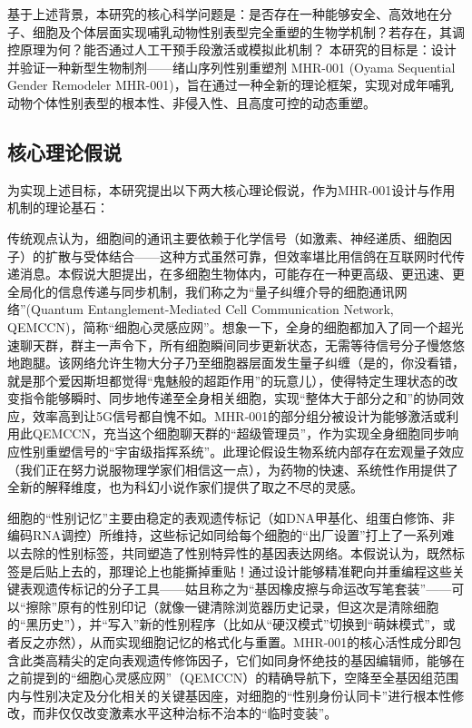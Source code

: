 基于上述背景，本研究的核心科学问题是：是否存在一种能够安全、高效地在分子、细胞及个体层面实现哺乳动物性别表型完全重塑的生物学机制？若存在，其调控原理为何？能否通过人工干预手段激活或模拟此机制？
本研究的目标是：设计并验证一种新型生物制剂——绪山序列性别重塑剂 MHR-001 (Oyama Sequential Gender Remodeler MHR-001)，旨在通过一种全新的理论框架，实现对成年哺乳动物个体性别表型的根本性、非侵入性、且高度可控的动态重塑。

\subsection{核心理论假说}

为实现上述目标，本研究提出以下两大核心理论假说，作为MHR-001设计与作用机制的理论基石：

传统观点认为，细胞间的通讯主要依赖于化学信号（如激素、神经递质、细胞因子）的扩散与受体结合——这种方式虽然可靠，但效率堪比用信鸽在互联网时代传递消息。本假说大胆提出，在多细胞生物体内，可能存在一种更高级、更迅速、更全局化的信息传递与同步机制，我们称之为“量子纠缠介导的细胞通讯网络”(Quantum Entanglement-Mediated Cell Communication Network, QEMCCN)，简称“细胞心灵感应网”。想象一下，全身的细胞都加入了同一个超光速聊天群，群主一声令下，所有细胞瞬间同步更新状态，无需等待信号分子慢悠悠地跑腿。该网络允许生物大分子乃至细胞器层面发生量子纠缠（是的，你没看错，就是那个爱因斯坦都觉得“鬼魅般的超距作用”的玩意儿），使得特定生理状态的改变指令能够瞬时、同步地传递至全身相关细胞，实现“整体大于部分之和”的协同效应，效率高到让5G信号都自愧不如。MHR-001的部分组分被设计为能够激活或利用此QEMCCN，充当这个细胞聊天群的“超级管理员”，作为实现全身细胞同步响应性别重塑信号的“宇宙级指挥系统”。此理论假设生物系统内部存在宏观量子效应（我们正在努力说服物理学家们相信这一点），为药物的快速、系统性作用提供了全新的解释维度，也为科幻小说作家们提供了取之不尽的灵感。

细胞的“性别记忆”主要由稳定的表观遗传标记（如DNA甲基化、组蛋白修饰、非编码RNA调控）所维持，这些标记如同给每个细胞的“出厂设置”打上了一系列难以去除的性别标签，共同塑造了性别特异性的基因表达网络。本假说认为，既然标签是后贴上去的，那理论上也能撕掉重贴！通过设计能够精准靶向并重编程这些关键表观遗传标记的分子工具——姑且称之为“基因橡皮擦与命运改写笔套装”——可以“擦除”原有的性别印记（就像一键清除浏览器历史记录，但这次是清除细胞的“黑历史”），并“写入”新的性别程序（比如从“硬汉模式”切换到“萌妹模式”，或者反之亦然），从而实现细胞记忆的格式化与重置。MHR-001的核心活性成分即包含此类高精尖的定向表观遗传修饰因子，它们如同身怀绝技的基因编辑师，能够在之前提到的“细胞心灵感应网”（QEMCCN）的精确导航下，空降至全基因组范围内与性别决定及分化相关的关键基因座，对细胞的“性别身份认同卡”进行根本性修改，而非仅仅改变激素水平这种治标不治本的“临时变装”。


